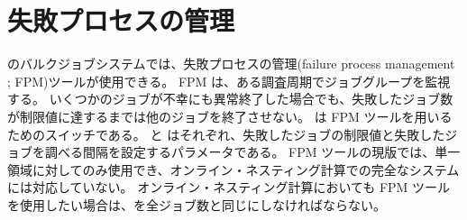 \section{失敗プロセスの管理}
\scalerm のバルクジョブシステムでは、失敗プロセスの管理(failure process management ; FPM)ツールが使用できる。
FPM は、ある調査周期でジョブグループを監視する。
いくつかのジョブが不幸にも異常終了した場合でも、失敗したジョブ数が制限値に達するまでは他のジョブを終了させない。
 は FPM ツールを用いるためのスイッチである。
 と  はそれぞれ、失敗したジョブの制限値と失敗したジョブを調べる間隔を設定するパラメータである。
FPM ツールの現版では、単一領域に対してのみ使用でき、オンライン・ネスティング計算での完全なシステムには対応していない。
オンライン・ネスティング計算においても FPM ツールを使用したい場合は、を全ジョブ数と同じにしなければならない。


